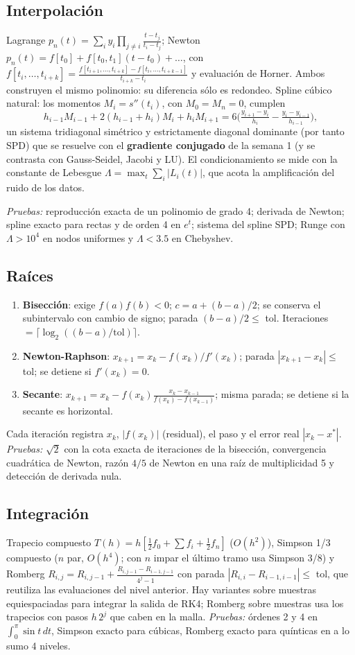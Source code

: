 \documentclass[11pt,letterpaper]{article}
\begin{document}
\subsection{Interpolación}
Lagrange $p_n(t)=\sum_i y_i\prod_{j\ne i}\frac{t-t_j}{t_i-t_j}$; Newton $p_n(t)=f[t_0]+f[t_0,t_1](t-t_0)+\dots$, con $f[t_i,\dots,t_{i+k}]=\frac{f[t_{i+1},\dots,t_{i+k}]-f[t_i,\dots,t_{i+k-1}]}{t_{i+k}-t_i}$ y evaluación de Horner. Ambos construyen el mismo polinomio: su diferencia sólo es redondeo. Spline cúbico natural: los momentos $M_i=s''(t_i)$, con $M_0=M_n=0$, cumplen
\[ h_{i-1}M_{i-1}+2(h_{i-1}+h_i)M_i+h_iM_{i+1}=6\Big(\tfrac{y_{i+1}-y_i}{h_i}-\tfrac{y_i-y_{i-1}}{h_{i-1}}\Big), \]
un sistema tridiagonal simétrico y estrictamente diagonal dominante (por tanto SPD) que se resuelve con el \textbf{gradiente conjugado} de la semana 1 (y se contrasta con Gauss-Seidel, Jacobi y LU). El condicionamiento se mide con la constante de Lebesgue $\Lambda=\max_t\sum_i|L_i(t)|$, que acota la amplificación del ruido de los datos.

\textit{Pruebas:} reproducción exacta de un polinomio de grado 4; derivada de Newton; spline exacto para rectas y de orden 4 en $e^t$; sistema del spline SPD; Runge con $\Lambda>10^4$ en nodos uniformes y $\Lambda<3.5$ en Chebyshev.

\subsection{Raíces}
\begin{enumerate}
\item \textbf{Bisección}: exige $f(a)f(b)<0$; $c=a+(b-a)/2$; se conserva el subintervalo con cambio de signo; parada $(b-a)/2\le$ tol. Iteraciones $=\lceil\log_2((b-a)/\mathrm{tol})\rceil$.
\item \textbf{Newton-Raphson}: $x_{k+1}=x_k-f(x_k)/f'(x_k)$; parada $|x_{k+1}-x_k|\le$ tol; se detiene si $f'(x_k)=0$.
\item \textbf{Secante}: $x_{k+1}=x_k-f(x_k)\frac{x_k-x_{k-1}}{f(x_k)-f(x_{k-1})}$; misma parada; se detiene si la secante es horizontal.
\end{enumerate}
Cada iteración registra $x_k$, $|f(x_k)|$ (residual), el paso y el error real $|x_k-x^*|$. \textit{Pruebas:} $\sqrt2$ con la cota exacta de iteraciones de la bisección, convergencia cuadrática de Newton, razón $4/5$ de Newton en una raíz de multiplicidad 5 y detección de derivada nula.

\subsection{Integración}
Trapecio compuesto $T(h)=h[\tfrac12f_0+\sum f_i+\tfrac12f_n]$ ($O(h^2)$), Simpson 1/3 compuesto ($n$ par, $O(h^4)$; con $n$ impar el último tramo usa Simpson 3/8) y Romberg $R_{i,j}=R_{i,j-1}+\frac{R_{i,j-1}-R_{i-1,j-1}}{4^j-1}$ con parada $|R_{i,i}-R_{i-1,i-1}|\le$ tol, que reutiliza las evaluaciones del nivel anterior. Hay variantes sobre muestras equiespaciadas para integrar la salida de RK4; Romberg sobre muestras usa los trapecios con pasos $h\,2^j$ que caben en la malla. \textit{Pruebas:} órdenes 2 y 4 en $\int_0^\pi\sin t\,dt$, Simpson exacto para cúbicas, Romberg exacto para quínticas en a lo sumo 4 niveles.
\end{document}
